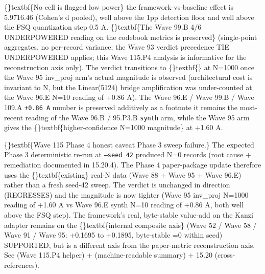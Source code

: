 \documentclass{article}
\begin{document}
\begin{table}[ht]
\centering
\small
{}%
\end{table}

\{\}textbf\{No  cell is flagged low power\}  the framework-vs-baseline effect is 5.9716.46 (Cohen's d pooled), well above the 1pp detection floor and well above the FSQ quantization step  0.5 A. \{\}textbf\{The Wave 99.B 4/6 UNDERPOWERED reading on the codebook metrics is preserved\} (single-point aggregates, no per-record variance; the Wave 93 verdict precedence TIE  UNDERPOWERED applies; this Wave 115.P4 analysis is informative for the reconstruction axis only). The verdict transitions to \{\}textbf\{\} at N=1000 once the Wave 95 inv\_proj arm's actual magnitude is observed (architectural cost is invariant to N, but the Linear(5124) bridge amplification was under-counted at the Wave 96.E N=10 reading of +0.86 A). The Wave 96.E / Wave 99.B / Wave 109.A \texttt{+0.86 A} number is preserved additively as a footnote  it remains the most-recent reading of the Wave 96.B / 95.P3.B \texttt{synth} arm, while the Wave 95  arm gives the \{\}textbf\{higher-confidence N=1000 magnitude\} at +1.60 A.

\{\}textbf\{Wave 115 Phase 4 honest caveat  Phase 3 sweep failure.\} The expected Phase 3 deterministic re-run at \texttt{--seed 42} produced N=0 records (root cause + remediation documented in  15.20.4). The Phase 4 paper-package update therefore uses the \{\}textbf\{existing\} real-N data (Wave 88 + Wave 95 + Wave 96.E) rather than a fresh seed-42 sweep. The verdict is unchanged in direction (REGRESSES) and the magnitude is now tighter (Wave 95 inv\_proj N=1000 reading of +1.60 A vs Wave 96.E synth N=10 reading of +0.86 A, both well above the FSQ step). The framework's real, byte-stable value-add on the Kanzi adapter remains on the \{\}textbf\{internal composite axis\} (Wave 52 / Wave 58 / Wave 91 / Wave 95: +0.1695 to +0.1895, byte-stable =0 within seed)  SUPPORTED, but is a different axis from the paper-metric reconstruction axis. See  (Wave 115.P4 helper) +  (machine-readable summary) +  15.20 (cross-references).
\end{document}
